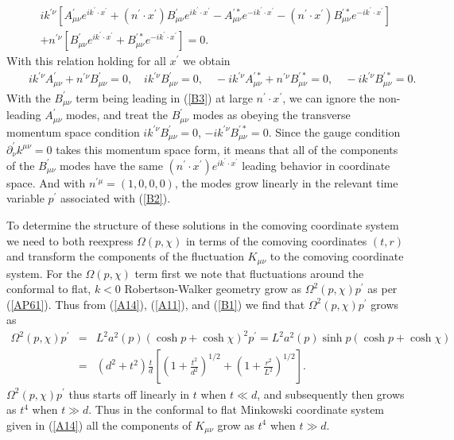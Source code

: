 \documentclass[aps]{revtex4}
\begin{document}
%
\begin{eqnarray}
&&ik^{\prime \nu}\left[A^{\prime}_{\mu\nu}e^{ik^{\prime}\cdot x^{\prime}}+(n^{\prime}\cdot x^{\prime})B^{\prime}_{\mu\nu}e^{ik^{\prime}\cdot x^{\prime}}-A^{\prime *}_{\mu\nu}e^{-ik^{\prime}\cdot x^{\prime}}-(n^{\prime}\cdot x^{\prime})B^{\prime *}_{\mu\nu}e^{-ik^{\prime}\cdot x^{\prime}}\right]
\nonumber\\
&&+n^{\prime\nu}\left[B^{\prime}_{\mu\nu}e^{ik^{\prime}\cdot x^{\prime}}+B^{\prime *}_{\mu\nu}e^{-ik^{\prime}\cdot x^{\prime}}\right]=0.
\label{B4}
\end{eqnarray}
%
With this relation holding for all $x^{\prime}$ we obtain
%
\begin{eqnarray}
&&ik^{\prime \nu}A^{\prime}_{\mu\nu}+n^{ \prime\nu}B^{\prime}_{\mu\nu}=0,\quad ik^{\prime \nu}B^{\prime}_{\mu\nu}=0,
\quad -ik^{\prime \nu}A^{\prime *}_{\mu\nu}+n^{ \prime\nu}B^{\prime *}_{\mu\nu}=0,\quad -ik^{\prime \nu}B^{\prime *}_{\mu\nu}=0.
\label{B5}
\end{eqnarray}
%
With the $B^{\prime}_{\mu\nu}$ term being leading in (\ref{B3}) at large $n^{\prime}\cdot x^{\prime}$, we can ignore the non-leading $A^{\prime}_{\mu\nu}$ modes, and treat the $B^{\prime}_{\mu\nu}$ modes as obeying the transverse momentum space condition  $ik^{\prime \nu}B^{\prime}_{\mu\nu}=0$, $-ik^{\prime \nu}B^{\prime *}_{\mu\nu}=0$. Since the gauge condition $\partial^{\prime}_{\nu}k^{\mu\nu}=0$ takes this momentum space form, it means that all of the components of the $B^{\prime}_{\mu\nu}$ modes have the same $(n^{\prime}\cdot x^{\prime})e^{ik^{\prime}\cdot x^{\prime}}$ leading behavior in coordinate space. And with $n^{\prime \mu}=(1,0,0,0)$, the modes grow linearly in the relevant time variable $p^{\prime}$ associated with (\ref{B2}).

To determine the structure of these solutions in the comoving coordinate system we need to both reexpress $\Omega(p,\chi)$ in terms of the comoving coordinates $(t,r)$ and transform the components of the fluctuation $K_{\mu\nu}$ to the comoving coordinate system. For the $\Omega(p,\chi)$ term first  we note that fluctuations around the conformal to flat, $k<0$ Robertson-Walker geometry grow as $\Omega^2(p,\chi)p^{\prime}$ as per (\ref{AP61}). Thus  from (\ref{A14}), (\ref{A11}), and (\ref{B1}) we find that $\Omega^2(p,\chi)p^{\prime}$ grows as
%
\begin{eqnarray}
\Omega^2(p,\chi)p^{\prime}&=&L^2a^2(p)(\cosh p+\cosh \chi)^2p^{\prime}=L^2a^2(p)\sinh p (\cosh p+\cosh \chi)
\nonumber\\
&=&(d^2+t^2)\frac{t}{d}\left[\left(1+\frac{t^2}{d^2}\right)^{1/2}+\left(1+\frac{r^2}{L^2}\right)^{1/2}\right].
\label{B6}
\end{eqnarray}
%
 $\Omega^2(p,\chi)p^{\prime}$ thus starts off linearly in $t$ when $t\ll d$, and subsequently then grows as $t^4$ when $t\gg d$. Thus in the conformal to flat Minkowski coordinate system given in (\ref{A14}) all the components of $K_{\mu\nu}$ grow as $t^4$ when $t \gg d$.
\end{document}
